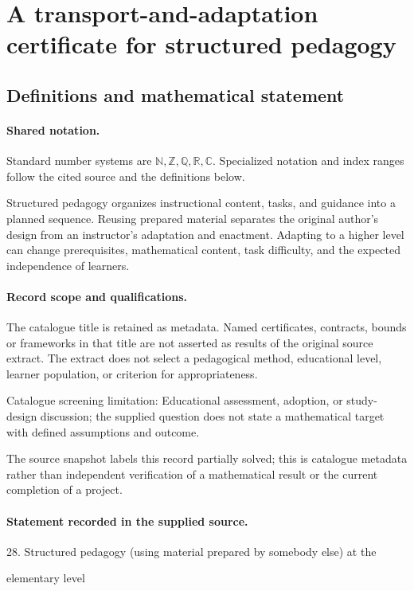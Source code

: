 \documentclass[11pt]{article}
\begin{document}
\section{A transport-and-adaptation certificate for structured pedagogy}\label{statement}

\subsection{Definitions and mathematical statement}

\paragraph{Shared notation.}Standard number systems are $\mathbb N,\mathbb Z,\mathbb Q,\mathbb R,\mathbb C$. Specialized notation and index ranges follow the cited source and the definitions below.


Structured pedagogy organizes instructional content, tasks, and guidance into a planned sequence. Reusing prepared material separates the original author's design from an instructor's adaptation and enactment. Adapting to a higher level can change prerequisites, mathematical content, task difficulty, and the expected independence of learners.
\paragraph{Record scope and qualifications.}
The catalogue title is retained as metadata. Named certificates, contracts, bounds or frameworks in that title are not asserted as results of the original source extract.
The extract does not select a pedagogical method, educational level, learner population, or criterion for appropriateness.

Catalogue screening limitation: Educational assessment, adoption, or study-design discussion; the supplied question does not state a mathematical target with defined assumptions and outcome.

The source snapshot labels this record partially solved; this is catalogue metadata rather than independent verification of a mathematical result or the current completion of a project.
\paragraph{Statement recorded in the supplied source.}
28. Structured pedagogy (using material prepared by somebody else) at the

elementary level
\end{document}
